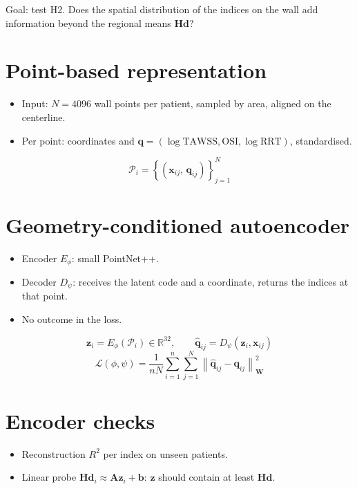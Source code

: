 Goal: test H2. Does the spatial distribution of the indices on the wall add information beyond the regional means $\mathbf{Hd}$?

\section{Point-based representation}
\begin{itemize}
    \item Input: $N = 4096$ wall points per patient, sampled by area, aligned on the centerline.
    \item Per point: coordinates and $\mathbf{q} = (\log\mathrm{TAWSS}, \mathrm{OSI}, \log\mathrm{RRT})$, standardised.
\end{itemize}
\begin{equation}
    \mathcal{P}_i = \left\{ \left(\mathbf{x}_{ij},\, \mathbf{q}_{ij}\right) \right\}_{j=1}^{N}
\end{equation}

\section{Geometry-conditioned autoencoder}
\begin{itemize}
    \item Encoder $E_\phi$: small PointNet++. 
    \item Decoder $D_\psi$: receives the latent code and a coordinate, returns the indices at that point.
    \item No outcome in the loss.
\end{itemize}
\begin{equation}
    \mathbf{z}_i = E_\phi(\mathcal{P}_i) \in \mathbb{R}^{32},
    \qquad
    \hat{\mathbf{q}}_{ij} = D_\psi(\mathbf{z}_i, \mathbf{x}_{ij})
\end{equation}
\begin{equation}
    \mathcal{L}(\phi,\psi) = \frac{1}{nN}\sum_{i=1}^{n}\sum_{j=1}^{N} \left\lVert \hat{\mathbf{q}}_{ij} - \mathbf{q}_{ij} \right\rVert^2_{\mathbf{W}}
\end{equation}

\section{Encoder checks}
\begin{itemize}
    \item Reconstruction $R^2$ per index on unseen patients.
    \item Linear probe $\mathbf{Hd}_i \approx \mathbf{A}\mathbf{z}_i + \mathbf{b}$: $\mathbf{z}$ should contain at least $\mathbf{Hd}$.
\end{itemize}

